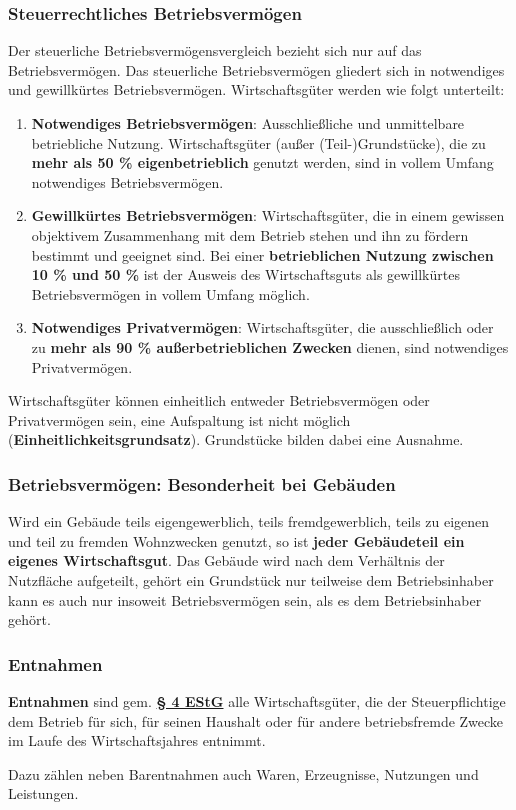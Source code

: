 \documentclass[12pt,A4]{extarticle}
\newcommand{\highlight}[1]{\textcolor{highlightColor}{\textbf{#1}}}
\newcommand{\estG}[2][]{\textbf{\textcolor{gesetzLink}{\href{https://www.gesetze-im-internet.de/estg/__#2.html}{§ #2 \ifthenelse{\equal{#1}{}}{}{#1 }EStG}}}}
\begin{document}
\subsubsection{Steuerrechtliches Betriebsvermögen}
Der steuerliche Betriebsvermögensvergleich bezieht sich nur auf das Betriebsvermögen. Das steuerliche Betriebsvermögen gliedert sich in notwendiges und gewillkürtes Betriebsvermögen. Wirtschaftsgüter werden wie folgt unterteilt:
\begin{enumerate}
  \item{\highlight{Notwendiges Betriebsvermögen}: Ausschließliche und unmittelbare betriebliche Nutzung. Wirtschaftsgüter (außer (Teil-)Grundstücke), die zu \textbf{mehr als 50 \% eigenbetrieblich} genutzt werden, sind in vollem Umfang notwendiges Betriebsvermögen.}
  \item{\highlight{Gewillkürtes Betriebsvermögen}: Wirtschaftsgüter, die in einem gewissen objektivem Zusammenhang mit dem Betrieb stehen und ihn zu fördern bestimmt und geeignet sind. Bei einer \textbf{betrieblichen Nutzung zwischen 10 \% und 50 \%} ist der Ausweis des Wirtschaftsguts als gewillkürtes Betriebsvermögen in vollem Umfang möglich.}
  \item{\highlight{Notwendiges Privatvermögen}: Wirtschaftsgüter, die ausschließlich oder zu \textbf{mehr als 90 \% außerbetrieblichen Zwecken} dienen, sind notwendiges Privatvermögen.}
\end{enumerate}
Wirtschaftsgüter können einheitlich entweder Betriebsvermögen oder Privatvermögen sein, eine Aufspaltung ist nicht möglich (\textbf{Einheitlichkeitsgrundsatz}). Grundstücke bilden dabei eine Ausnahme.

\subsubsection{Betriebsvermögen: Besonderheit bei Gebäuden}
Wird ein Gebäude teils eigengewerblich, teils fremdgewerblich, teils zu eigenen und teil zu fremden Wohnzwecken genutzt, so ist \textbf{jeder Gebäudeteil ein eigenes Wirtschaftsgut}. Das Gebäude wird nach dem Verhältnis der Nutzfläche aufgeteilt, gehört ein Grundstück nur teilweise dem Betriebsinhaber kann es auch nur insoweit Betriebsvermögen sein, als es dem Betriebsinhaber gehört.

\subsubsection{Entnahmen}
\highlight{Entnahmen} sind gem. \estG[Abs. 1 S. 2]{4} alle Wirtschaftsgüter, die der Steuerpflichtige dem Betrieb für sich, für seinen Haushalt oder für andere betriebsfremde Zwecke im Laufe des Wirtschaftsjahres entnimmt.\par
Dazu zählen neben Barentnahmen auch Waren, Erzeugnisse, Nutzungen und Leistungen.
\end{document}

